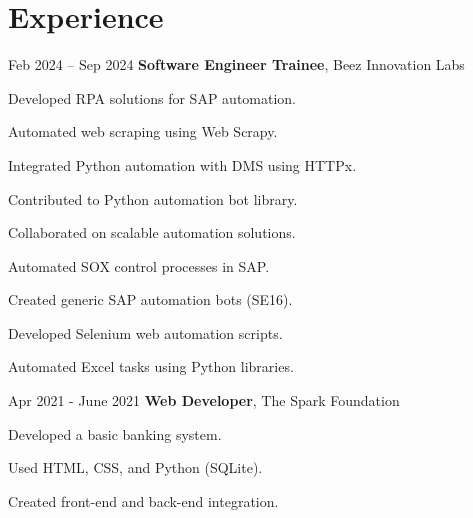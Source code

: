 \section{Experience}
\begin{twocolentry}{Feb 2024 – Sep 2024}
\textbf{Software Engineer Trainee}, Beez Innovation Labs\end{twocolentry}
\vspace{0.10 cm}
\begin{onecolentry}
\begin{highlights}
\item Developed RPA solutions for SAP automation.
\item Automated web scraping using Web Scrapy.
\item Integrated Python automation with DMS using HTTPx.
\item Contributed to Python automation bot library.
\item Collaborated on scalable automation solutions.
\item Automated SOX control processes in SAP.
\item Created generic SAP automation bots (SE16).
\item Developed Selenium web automation scripts.
\item Automated Excel tasks using Python libraries.
\end{highlights}
\end{onecolentry}
\vspace{0.2 cm}
\begin{twocolentry}{Apr 2021 - June 2021}
\textbf{Web Developer}, The Spark Foundation\end{twocolentry}
\vspace{0.10 cm}
\begin{onecolentry}
\begin{highlights}
\item Developed a basic banking system.
\item Used HTML, CSS, and Python (SQLite).
\item Created front-end and back-end integration.
\end{highlights}
\end{onecolentry}



